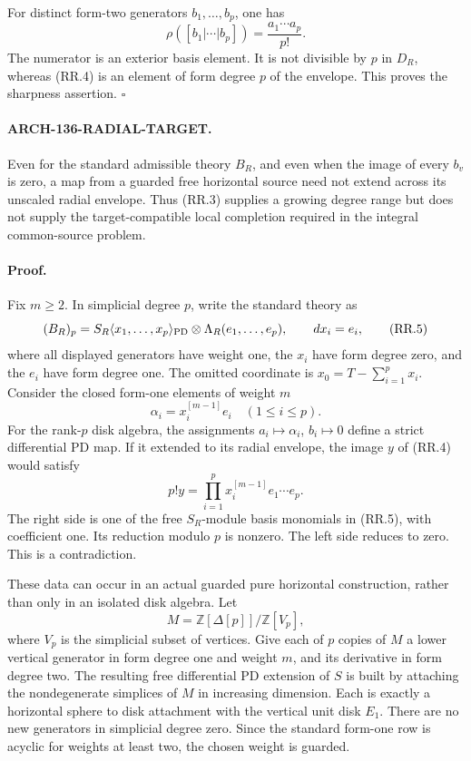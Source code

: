 For distinct form-two generators \(b_1,\ldots,b_p\), one has
\[
 \rho([b_1|\cdots|b_p])=\frac{a_1\cdots a_p}{p!}.
 \tag{RR.4}
\]
The numerator is an exterior basis element. It is not divisible
by \(p\) in \(D_R\), whereas (RR.4) is an element of form
degree \(p\) of the envelope. This proves the sharpness assertion.
\(\square\)

\paragraph{ARCH-136-RADIAL-TARGET.}
Even for the standard admissible theory \(B_R\), and even when
the image of every \(b_v\) is zero, a map from a guarded free
horizontal source need not extend across its unscaled radial
envelope. Thus (RR.3) supplies a growing degree range but does
not supply the target-compatible local completion required in
the integral common-source problem.

\paragraph{Proof.}
Fix \(m\geq2\). In simplicial degree \(p\), write the standard
theory as
\[
 (B_R)_p=S_R\langle x_1,\ldots,x_p\rangle_{\rm PD}
                    \otimes\Lambda_R(e_1,\ldots,e_p),
 \qquad dx_i=e_i,
 \tag{RR.5}
\]
where all displayed generators have weight one, the \(x_i\)
have form degree zero, and the \(e_i\) have form degree one.
The omitted coordinate is \(x_0=T-\sum_{i=1}^p x_i\).
Consider the closed form-one elements of weight \(m\)
\[
                       \alpha_i=x_i^{[m-1]}e_i
                         \quad(1\leq i\leq p).
 \tag{RR.6}
\]
For the rank-\(p\) disk algebra, the assignments
\(a_i\mapsto\alpha_i\), \(b_i\mapsto0\) define a strict
differential PD map. If it extended to its radial envelope, the
image \(y\) of (RR.4) would satisfy
\[
             p!y=\prod_{i=1}^p x_i^{[m-1]}e_1\cdots e_p.
 \tag{RR.7}
\]
The right side is one of the free \(S_R\)-module basis
monomials in (RR.5), with coefficient one. Its reduction modulo
\(p\) is nonzero. The left side reduces to zero. This is a
contradiction.

These data can occur in an actual guarded pure horizontal
construction, rather than only in an isolated disk algebra.
Let
\[
 M=\mathbb Z[\Delta[p]]/\mathbb Z[V_p],
 \tag{RR.8}
\]
where \(V_p\) is the simplicial subset of vertices. Give each
of \(p\) copies of \(M\) a lower vertical generator in form
degree one and weight \(m\), and its derivative in form degree
two. The resulting free differential PD extension of \(S\)
is built by attaching the nondegenerate simplices of \(M\)
in increasing dimension. Each is exactly a horizontal sphere
to disk attachment with the vertical unit disk \(E_1\).
There are no new generators in simplicial degree zero. Since
the standard form-one row is acyclic for weights at least two,
the chosen weight is guarded.

